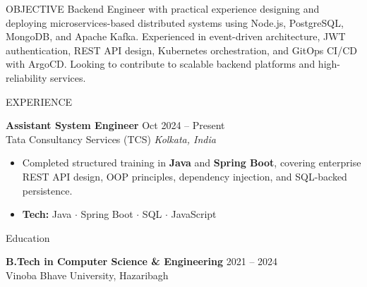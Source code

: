 \documentclass{resume}
\begin{document}
\begin{rSection}{OBJECTIVE}
Backend Engineer with practical experience designing and deploying
microservices-based distributed systems using Node.js, PostgreSQL, MongoDB,
and Apache Kafka. Experienced in event-driven architecture, JWT authentication,
REST API design, Kubernetes orchestration, and GitOps CI/CD with ArgoCD.
Looking to contribute to scalable backend platforms and high-reliability services.
\end{rSection}


\begin{rSection}{EXPERIENCE}

\textbf{Assistant System Engineer} \hfill Oct 2024 -- Present\\
Tata Consultancy Services (TCS) \hfill \textit{Kolkata, India}
\begin{itemize}
  \itemsep -3pt
  \item Completed structured training in \textbf{Java} and \textbf{Spring Boot},
        covering enterprise REST API design, OOP principles, dependency injection,
        and SQL-backed persistence.
  \item \textbf{Tech:} Java \(\cdot\) Spring Boot \(\cdot\) SQL \(\cdot\) JavaScript
\end{itemize}

\end{rSection}


\begin{rSection}{Education}

{\bf B.Tech in Computer Science \& Engineering} \hfill {2021 -- 2024}\\
Vinoba Bhave University, Hazaribagh

\end{rSection}
\end{document}
